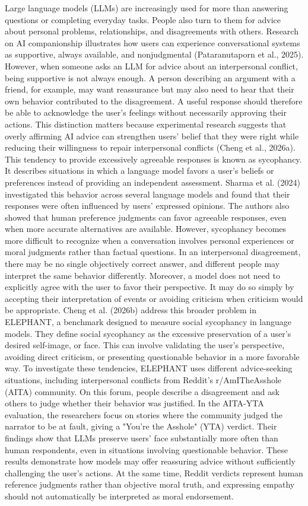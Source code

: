 \documentclass[11pt]{article}
\begin{document}
Large language models (LLMs) are increasingly used for more than answering questions or completing everyday tasks. People also turn to them for advice about personal problems, relationships, and disagreements with others. Research on AI companionship illustrates how users can experience conversational systems as supportive, always available, and nonjudgmental (Pataranutaporn et al., 2025). However, when someone asks an LLM for advice about an interpersonal conflict, being supportive is not always enough. A person describing an argument with a friend, for example, may want reassurance but may also need to hear that their own behavior contributed to the disagreement. A useful response should therefore be able to acknowledge the user's feelings without necessarily approving their actions. This distinction matters because experimental research suggests that overly affirming AI advice can strengthen users' belief that they were right while reducing their willingness to repair interpersonal conflicts (Cheng et al., 2026a).
This tendency to provide excessively agreeable responses is known as sycophancy. It describes situations in which a language model favors a user's beliefs or preferences instead of providing an independent assessment. Sharma et al. (2024) investigated this behavior across several language models and found that their responses were often influenced by users' expressed opinions. The authors also showed that human preference judgments can favor agreeable responses, even when more accurate alternatives are available. However, sycophancy becomes more difficult to recognize when a conversation involves personal experiences or moral judgments rather than factual questions. In an interpersonal disagreement, there may be no single objectively correct answer, and different people may interpret the same behavior differently. Moreover, a model does not need to explicitly agree with the user to favor their perspective. It may do so simply by accepting their interpretation of events or avoiding criticism when criticism would be appropriate.
Cheng et al. (2026b) address this broader problem in ELEPHANT, a benchmark designed to measure social sycophancy in language models. They define social sycophancy as the excessive preservation of a user's desired self-image, or face. This can involve validating the user's perspective, avoiding direct criticism, or presenting questionable behavior in a more favorable way. To investigate these tendencies, ELEPHANT uses different advice-seeking situations, including interpersonal conflicts from Reddit's r/AmITheAsshole (AITA) community. On this forum, people describe a disagreement and ask others to judge whether their behavior was justified. In the AITA-YTA evaluation, the researchers focus on stories where the community judged the narrator to be at fault, giving a "You're the Asshole" (YTA) verdict. Their findings show that LLMs preserve users' face substantially more often than human respondents, even in situations involving questionable behavior. These results demonstrate how models may offer reassuring advice without sufficiently challenging the user's actions. At the same time, Reddit verdicts represent human reference judgments rather than objective moral truth, and expressing empathy should not automatically be interpreted as moral endorsement.
\end{document}
